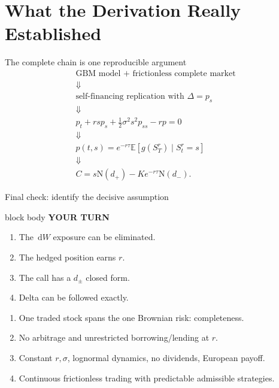 \documentclass[handout,10pt,aspectratio=169]{beamer}
\newenvironment{pausebox}{%
  \begin{beamercolorbox}[rounded=true,sep=0.8em,wd=\textwidth]{block body}
  \textbf{\color{CourseGold}YOUR TURN}\quad
}{\end{beamercolorbox}}
\newcommand{\dd}{\,\mathrm d}
\newcommand{\E}{\mathbb E}
\newcommand{\Ncdf}{\mathrm N}
\newcommand{\1}{\mathbf 1}
\begin{document}
\section{What the Derivation Really Established}

\begin{frame}{The complete chain is one reproducible argument}
\[
\boxed{
\begin{gathered}
\text{GBM model + frictionless complete market}\\
\Downarrow\\
\text{self-financing replication with }\Delta=p_s\\
\Downarrow\\
p_t+rsp_s+\tfrac12\sigma^2s^2p_{ss}-rp=0\\
\Downarrow\\
p(t,s)=e^{-r\tau}\E[g(S_T^r)\mid S_t^r=s]\\
\Downarrow\\
C=s\Ncdf(d_+)-Ke^{-r\tau}\Ncdf(d_-).
\end{gathered}}
\]
\end{frame}

\begin{frame}{Final check: identify the decisive assumption}
\begin{pausebox}
\begin{enumerate}
  \item The \(\dd W\) exposure can be eliminated.
  \item The hedged position earns \(r\).
  \item The call has a \(d_\pm\) closed form.
  \item Delta can be followed exactly.
\end{enumerate}
\end{pausebox}

\begin{enumerate}
  \item One traded stock spans the one Brownian risk: completeness.
  \item No arbitrage and unrestricted borrowing/lending at \(r\).
  \item Constant \(r,\sigma\), lognormal dynamics, no dividends, European payoff.
  \item Continuous frictionless trading with predictable admissible strategies.
\end{enumerate}
\end{frame}
\end{document}
